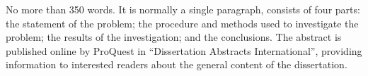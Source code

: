 No more than 350 words. It is normally a single paragraph, consists of four parts: the statement of the problem; the procedure and methods used to investigate the problem; the results of the investigation; and the conclusions. The abstract is published online by ProQuest in ``Dissertation Abstracts International'', providing information to interested readers about the general content of the dissertation.


